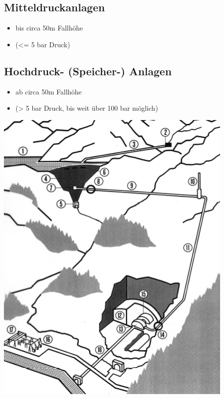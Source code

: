 \subsection{Mitteldruckanlagen}

\begin{itemize}
    \item bis circa 50m Fallhöhe
    \item (<= 5 bar Druck)
\end{itemize}


\subsection{Hochdruck- (Speicher-) Anlagen}

\begin{itemize}
    \item ab circa 50m Fallhöhe
    \item (> 5 bar Druck, bis weit über 100 bar möglich)
\end{itemize}

\begin{center}
    \includegraphics[width=0.95\columnwidth, align=c]{images/Hochdruckspeicheranlagen.png}
\end{center}

